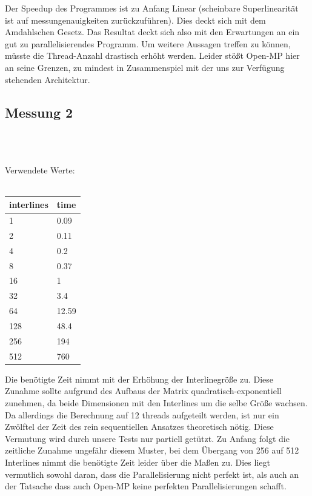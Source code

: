 \documentclass[a4paper,11pt,fleqn]{scrartcl}
\begin{document}
Der Speedup des Programmes ist zu Anfang Linear (scheinbare Superlinearität ist auf messungenauigkeiten zurückzuführen). Dies deckt sich mit dem Amdahlschen Gesetz. Das Resultat deckt sich also mit den Erwartungen an ein gut zu parallelisierendes Programm. Um weitere Aussagen treffen zu können, müsste die Thread-Anzahl drastisch erhöht werden. Leider stößt Open-MP hier an seine Grenzen, zu mindest in Zusammenspiel mit der uns zur Verfügung stehenden Architektur.

\subsection{Messung 2}
 \\ \\
\begin{center}
Verwendete Werte: \\ \quad \\
	\begin{tabular}[c]{l|l}
	interlines & time \\ \hline
	1& 0.09 \\
	2& 0.11 \\
	4& 0.2 \\
	8& 0.37 \\
	16& 1 \\
	32& 3.4 \\
	64& 12.59 \\
	128& 48.4 \\
	256& 194 \\
	512& 760 \\
\end{tabular}
\end{center}

Die benötigte Zeit nimmt mit der Erhöhung der Interlinegröße zu. Diese Zunahme sollte aufgrund des Aufbaus der Matrix quadratisch-exponentiell zunehmen, da beide Dimensionen mit den Interlines um die selbe Größe wachsen. Da allerdings die Berechnung auf 12 threads aufgeteilt werden, ist nur ein Zwölftel der Zeit des rein sequentiellen Ansatzes theoretisch nötig. Diese Vermutung wird durch unsere Tests nur partiell getützt. Zu Anfang folgt die zeitliche Zunahme ungefähr diesem Muster, bei dem Übergang von 256 auf 512 Interlines nimmt die benötigte Zeit leider über die Maßen zu. Dies liegt vermutlich sowohl daran, dass die Parallelisierung nicht perfekt ist, als auch an der Tatsache dass auch Open-MP keine perfekten Parallelisierungen schafft.
\end{document}
